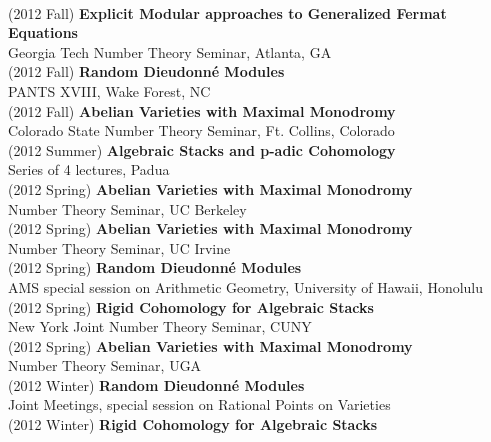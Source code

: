 \documentclass[margin,line]{res}
\begin{document}
\begin{resume}
\vspace{.05cm}\\
(2012 Fall) \textbf{Explicit Modular approaches to Generalized Fermat Equations}\\
Georgia Tech Number Theory Seminar, Atlanta, GA 
\vspace{.05cm}\\
(2012 Fall) \textbf{Random Dieudonn\'e Modules}\\
PANTS XVIII, Wake Forest, NC 
\vspace{.05cm}\\
(2012 Fall) \textbf{Abelian Varieties with Maximal Monodromy}\\
Colorado State Number Theory Seminar, Ft. Collins, Colorado 
\vspace{.05cm}\\
(2012 Summer) \textbf{Algebraic Stacks and p-adic Cohomology}\\
Series of 4 lectures, Padua
\vspace{.05cm}\\
(2012 Spring) \textbf{Abelian Varieties with Maximal Monodromy}\\
Number Theory Seminar, UC Berkeley
\vspace{.05cm}\\
(2012 Spring) \textbf{Abelian Varieties with Maximal Monodromy}\\
Number Theory Seminar, UC Irvine
\vspace{.05cm}\\
(2012 Spring) \textbf{Random Dieudonn\'e Modules}\\
AMS special session on Arithmetic Geometry, University of Hawaii, Honolulu 
\vspace{.05cm}\\
(2012 Spring) \textbf{Rigid Cohomology for Algebraic Stacks}\\
New York Joint Number Theory Seminar, CUNY
\vspace{.05cm}\\
(2012 Spring) \textbf{Abelian Varieties with Maximal Monodromy}\\
Number Theory Seminar, UGA
\vspace{.05cm}\\
(2012 Winter) \textbf{Random Dieudonn\'e Modules}\\
Joint Meetings, special session on Rational Points on Varieties
\vspace{.05cm}\\
(2012 Winter) \textbf{Rigid Cohomology for Algebraic Stacks}\\

\end{resume}
\end{document}

